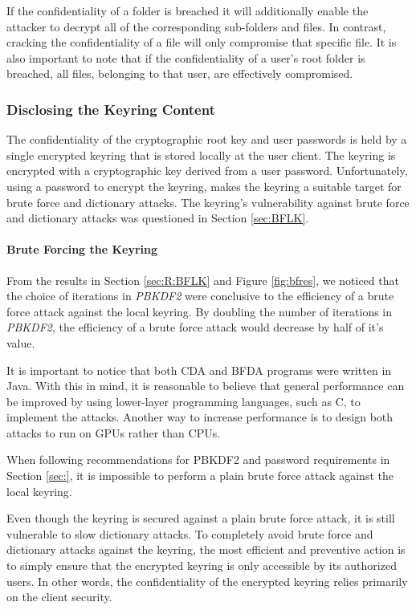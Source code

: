 \documentclass[pdftex,english,10pt,b5paper,twoside]{book}
\begin{document}
If the confidentiality of a folder is breached it will additionally enable the
attacker to decrypt all of the corresponding sub-folders and files. In contrast,
cracking the confidentiality of a file will only compromise that specific file. It is
also important to note that if the confidentiality of a user's root folder is breached,
all files, belonging to that user, are effectively compromised.

\subsubsection{Disclosing the Keyring Content}
The confidentiality of the cryptographic root key and user passwords is held by
a single encrypted keyring that is stored locally at the user client. The
keyring is encrypted with a cryptographic key derived from a user password.
Unfortunately, using a password to encrypt the keyring, makes the keyring a
suitable target for brute force and dictionary attacks. The keyring's
vulnerability against brute force and dictionary attacks was questioned in
Section \ref{sec:BFLK}.

\paragraph{Brute Forcing the Keyring}
From the results in Section \ref{sec:R:BFLK} and Figure \ref{fig:bfres}, we noticed
that the choice of iterations in \emph{PBKDF2} were conclusive to the efficiency of a
brute force attack against the local keyring. By doubling the number of
iterations in \emph{PBKDF2}, the efficiency of a brute force attack would decrease by
half of it's value.

It is important to notice that both CDA and \ac{BFDA} programs were
written in Java. With this in mind, it is reasonable to believe
that general performance can be improved by using lower-layer
programming languages, such as C, to implement the attacks. Another way to
increase performance is to design both attacks to run on \ac{GPU}s rather than CPUs.

When following recommendations for \ac{PBKDF2} and password requirements in Section \ref{sec:}, it
is impossible to perform a plain brute force attack against the local keyring.

Even though the keyring is secured against a plain brute force attack, it is
still vulnerable to slow dictionary attacks. To completely
avoid brute force and dictionary attacks against the keyring, the most efficient
and preventive action is to simply ensure that the encrypted keyring is
only accessible by its authorized users. In other words, the confidentiality of
the encrypted keyring relies primarily on the client security.
\end{document}
